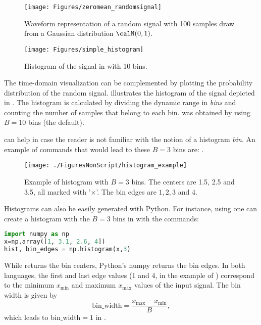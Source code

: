 \begin{figure}
	\centering
		\texttt{[image: Figures/zeromean\_randomsignal]}		
	\caption{Waveform representation of a random signal with 100 samples draw from a Gaussian distribution $\calN(0,1)$.\label{fig:zeromean_randomsignal}}
\end{figure}

\begin{figure}
	\centering
		\texttt{[image: Figures/simple\_histogram]}		
	\caption{Histogram of the signal in  with 10 bins.\label{fig:simple_histogram}}
\end{figure}

The time-domain visualization can be complemented by plotting the probability distribution of the random signal.
 illustrates the histogram of the signal depicted in . The histogram is calculated by dividing the dynamic range in \emph{bins} and counting the number of samples that belong to each bin.  was obtained by using $B=10$ bins (the default).

 can help in case the reader is not familiar with the notion of a histogram \emph{bin}.
An example of {\matlab} commands that would lead to these $B=3$ bins are: .

\begin{figure}[htbp]
\centering
\texttt{[image: ./FiguresNonScript/histogram\_example]}
\caption{Example of histogram with $B=3$ bins. The centers are 1.5, 2.5 and 3.5, all marked with '$\times$'. The
bin edges are $1, 2, 3$ and 4.\label{fig:histogram_example}}
\end{figure}

Histograms can also be easily generated with Python. For instance, using  one can create a histogram 
with the $B=3$ bins in  with the commands:
\begin{lstlisting}[language=Python]
import numpy as np
x=np.array([1, 3.1, 2.6, 4])
hist, bin_edges = np.histogram(x,3)
\end{lstlisting}
While {\matlab} returns the bin centers, Python's numpy returns the bin edges. 
In both languages, the first and last edge values (1 and 4, in the example of ) correspond to the minimum $x_{\textrm{min}}$ and maximum $x_{\textrm{max}}$ values of the input signal. The bin width is given by
\begin{equation}
\textrm{bin\_width}= \frac{x_{\textrm{max}}-x_{\textrm{min}}}{B},
\label{eq:hist_bin_width}
\end{equation}
which leads to $\textrm{bin\_width}=1$ in .
\eExample 

